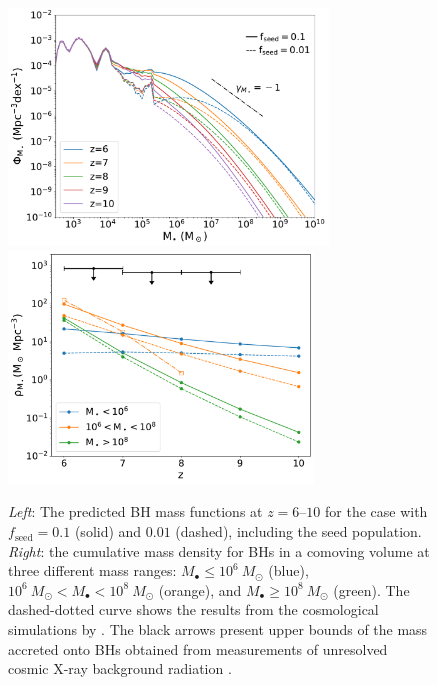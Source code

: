 \documentclass[twocolumn, twocolappendix]{aastex63}
\newcommand{\Msun}{M_\odot}
\newcommand{\fseed}{f_\mathrm{seed}}
\begin{document}
\begin{CJK*}{UTF8}{gbsn}
\begin{figure}
\centering
\includegraphics[width=85mm]{MF.pdf}\hspace{5mm}
\includegraphics[width=81mm]{rhoM_comb.pdf}
\caption{
{\it Left}: The predicted BH mass functions at $z=6$--$10$ for the case with $\fseed=0.1$ (solid) and $0.01$ (dashed), including the seed population.
{\it Right}: the cumulative mass density for BHs in a comoving volume at three different mass ranges: $M_\bullet \leq 10^6~\Msun$ (blue), $10^6~\Msun < M_\bullet < 10^8~\Msun$ (orange),
and $M_\bullet \geq 10^8~\Msun$ (green).
The dashed-dotted curve shows the results from the cosmological simulations by \citet{2022MNRAS.513..670N}.
The black arrows present upper bounds of the mass accreted onto BHs obtained from measurements of unresolved cosmic X-ray background radiation \citep{2013ApJ...778..130T}.
}
\label{fig:BHMF_rhoz}
\vspace{5mm}
\end{figure}



\end{CJK*}
\end{document}
